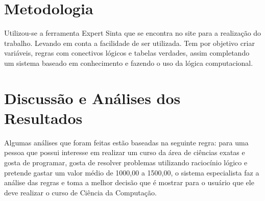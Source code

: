 \section{Metodologia}
\label{metodologia}

Utilizou-se a ferramenta Expert Sinta que se encontra no {site}\footnotemark {} para a  realização do trabalho. Levando em conta a facilidade de ser utilizada. Tem por objetivo criar variáveis,  regras com conectivos lógicos e tabelas verdades, assim completando um sistema baseado em conhecimento e fazendo o uso da lógica computacional.




\section{Discussão e Análises dos Resultados}
\label{discussão}
Algumas análises que foram feitas estão baseadas na seguinte regra: para uma pessoa que possui interesse em realizar um curso da área de ciências exatas e gosta de programar, gosta de resolver problemas utilizando raciocínio lógico e pretende gastar um valor médio de 1000,00 a 1500,00, o sistema especialista faz a análise das regras e toma a melhor decisão que é mostrar para o usuário que ele deve realizar o curso de Ciência da Computação. 



